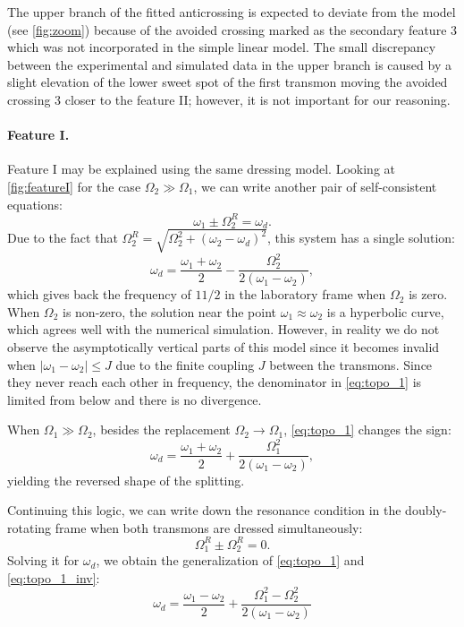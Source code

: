 \documentclass[%
 pra,
 amsmath,amssymb,
 reprint,%
]{revtex4-1}
\begin{document}
The upper branch of the fitted anticrossing is expected to deviate from the model (see \autoref{fig:zoom}) because of the avoided crossing marked as the secondary feature 3 which was not incorporated in the simple linear model. The small discrepancy between the experimental and simulated data in the upper branch is caused by a slight elevation of the lower sweet spot of the first transmon moving the avoided crossing 3 closer to the feature II; however, it is not important for our reasoning.	


\paragraph{Feature I.} Feature I may be explained using the same dressing model. Looking at \autoref{fig:featureI} for the case $\Omega_2 \gg \Omega_1$, we can write another pair of self-consistent equations:
\begin{equation}
\omega_{1} \pm \Omega_2^R = \omega_d.
\end{equation}
Due to the fact that $\Omega_2^R = \sqrt{\Omega_2^2 + (\omega_2 - \omega_d)^2}$, this system has a single solution:
\begin{equation}
\omega_d = \frac{\omega_1 + \omega_2}{2} - \frac{ \Omega_{2}^{2}}{2 \left(\omega_{1} - \omega_{2}\right)},
\label{eq:topo_1}
\end{equation}
which gives back the frequency of $11/2$ in the laboratory frame when $\Omega_2$ is zero. When $\Omega_2$ is non-zero, the solution near the point $\omega_1 \approx \omega_2$ is a hyperbolic curve, which agrees well with the numerical simulation. However, in reality we do not observe the asymptotically vertical parts of this model since it becomes invalid when $|\omega_1 - \omega_2| \leq J$ due to the finite coupling $J$ between the transmons. Since they never reach each other in frequency, the denominator in \eqref{eq:topo_1} is limited from below and there is no divergence.

When $\Omega_1 \gg \Omega_2$, besides the 
replacement $\Omega_2 \rightarrow \Omega_1$, 
\autoref{eq:topo_1} changes the sign:
\begin{equation}
\omega_d = \frac{\omega_1 + \omega_2}{2} + \frac{ \Omega_{1}^{2}}{2 \left(\omega_{1} - \omega_{2}\right)},
\label{eq:topo_1_inv}
\end{equation}
yielding the reversed shape of the splitting.

Continuing this logic, we can write down the resonance condition in the doubly-rotating frame when both transmons are dressed simultaneously:
\begin{equation}
\Omega_1^R \pm \Omega_2^R = 0.
\label{eq:zero-photon}
\end{equation}
Solving it for $\omega_d$, we obtain the 
generalization of \autoref{eq:topo_1} and 
\autoref{eq:topo_1_inv}:
\begin{equation}
\omega_d = \frac{\omega_{1} - \omega_{2}}{2} + \frac{\Omega_{1}^{2} - \Omega_{2}^{2}}{ 2\left(\omega_{1} - \omega_{2}\right)}
\label{eq:topo_comm}
\end{equation}
\end{document}
